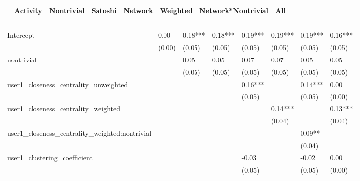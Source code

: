 \begin{table}
\caption{}
\begin{center}
\begin{tabular}{lccccccc}
\hline
                                               & Activity & Nontrivial & Satoshi & Network & Weighted & Network*Nontrivial &   All    \\
\hline
\hline
\end{tabular}
\begin{tabular}{llllllll}
Intercept                                      & 0.00     & 0.18***    & 0.18*** & 0.19*** & 0.19***  & 0.19***            & 0.16***  \\
                                               & (0.00)   & (0.05)     & (0.05)  & (0.05)  & (0.05)   & (0.05)             & (0.05)   \\
nontrivial                                     &          & 0.05       & 0.05    & 0.07    & 0.07     & 0.05               & 0.05     \\
                                               &          & (0.05)     & (0.05)  & (0.05)  & (0.05)   & (0.05)             & (0.05)   \\
user1_closeness_centrality_unweighted          &          &            &         & 0.16*** &          & 0.14***            & 0.00     \\
                                               &          &            &         & (0.05)  &          & (0.05)             & (0.00)   \\
user1_closeness_centrality_weighted            &          &            &         &         & 0.14***  &                    & 0.13***  \\
                                               &          &            &         &         & (0.04)   &                    & (0.04)   \\
user1_closeness_centrality_weighted:nontrivial &          &            &         &         &          & 0.09**             &          \\
                                               &          &            &         &         &          & (0.04)             &          \\
user1_clustering_coefficient                   &          &            &         & -0.03   &          & -0.02              & 0.00     \\
                                               &          &            &         & (0.05)  &          & (0.05)             & (0.00)   \\

\end{tabular}
\end{center}
\end{table}
